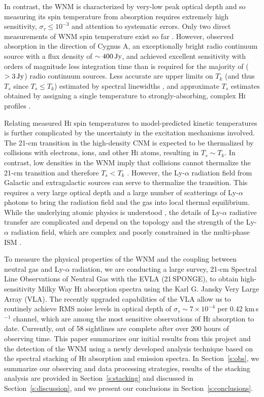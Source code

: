 \documentclass{aastex}
\begin{document}
In contrast, the WNM is characterized by very-low 
peak optical depth and so measuring its 
spin temperature from absorption requires extremely high 
sensitivity, $\sigma_{\tau}\leq 10^{-3}$ and attention to systematic errors. 
Only two direct measurements of WNM spin temperature exist 
so far \citep{CDG98,DCG02}. However, \citet{CDG98} observed 
absorption in the direction of Cygnus A, an exceptionally 
bright radio continuum source with a flux density of 
$\sim 400\rm\,Jy$, and achieved excellent sensitivity with 
orders of magnitude less integration time than is required for 
the majority of ($>3\rm\,Jy$) radio continuum sources.  Less 
accurate are upper limits on $T_k$ (and thus $T_s$ since $T_s\leq T_k$) estimated by spectral 
linewidths \citep{Mebold82,K03,HT031,Roy13two}, and approximate
$T_s$ estimates obtained by assigning a single temperature 
to strongly-absorbing, complex H\textsc{i} profiles 
\citep{KBR11,Roy13one}.

Relating measured H\textsc{i} spin temperatures to 
model-predicted kinetic temperatures is further complicated by 
the uncertainty in the excitation mechanisms involved.
The 21-cm transition in the high-density CNM is expected to be 
thermalized by collisions with electrons, ions, and other 
H\textsc{i} atoms, resulting in $T_s \sim T_k$.  In contrast, 
low densities in the WNM imply that collisions cannot thermalize 
the 21-cm transition and therefore $T_s<T_k$ 
\citep{Field58,DW85,Liszt01}. However, the Ly-$\alpha$ radiation 
field from Galactic and extragalactic sources can serve to 
thermalize the transition.  This requires a very large optical 
depth and a large number of scatterings of Ly-$\alpha$ photons
to bring the radiation field and the gas into local thermal 
equilibrium.  While the underlying atomic physics is 
understood \citep{Wouthuysen52,Field58,Pritchard12}, the details of Ly-$\alpha$ 
radiative transfer are complicated and depend on the topology 
and the strength of the Ly-$\alpha$ radiation field, which are 
complex and poorly constrained in the multi-phase 
ISM \citep{Liszt01}. 

To measure the physical properties of the WNM and the 
coupling between neutral gas and Ly-$\alpha$ radiation, 
we are conducting a large survey, 
21-cm Spectral Line Observations of Neutral Gas with the 
EVLA (21\,SPONGE), to obtain high-sensitivity Milky 
Way H\textsc{i} absorption spectra using the Karl G. 
Jansky Very Large Array (VLA).  The recently upgraded 
capabilities of the VLA allow us to routinely achieve 
RMS noise levels in optical depth of $\sigma_{\tau}\sim7\times10^{-4}$ 
per 0.42 km\,s$^{-1}$ channel, which are among the most 
sensitive observations of H\textsc{i} absorption to date. 
Currently, \NoOfSources{} out of 58 sightlines are complete 
after over 200 hours of observing time.
This paper summarizes our initial results from this project 
and the detection of the WNM using a newly developed analysis 
technique based on the spectral stacking of H\textsc{i} absorption and 
emission spectra. In Section~\ref{s:obs}, we summarize our 
observing and data processing strategies, results of the 
stacking analysis are provided in  Section~\ref{s:stacking} 
and discussed in Section~\ref{s:discussion}, and we present
our conclusions in Section~\ref{s:conclusions}.
\end{document}
